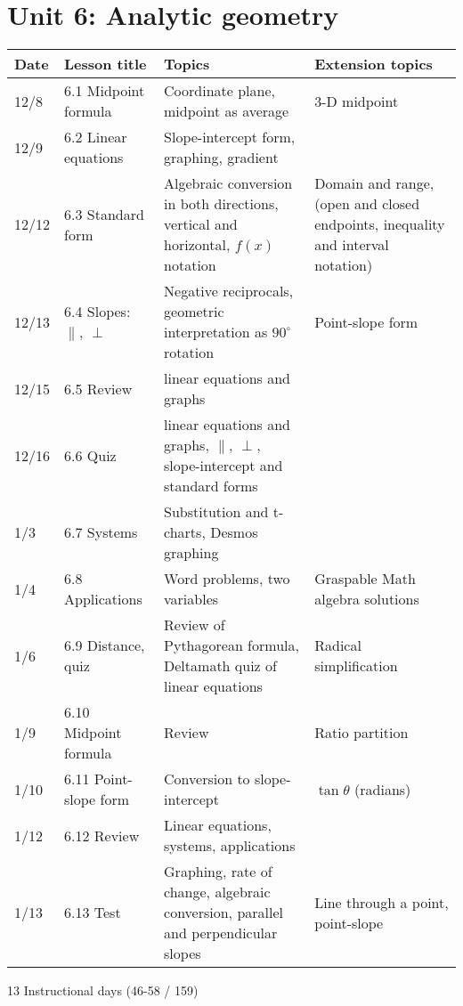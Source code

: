 \section*{Unit 6: Analytic geometry}
\begin{tabular}{|p{0.9cm}|p{4cm}|p{7cm}|p{5cm}|}
  \hline
  Date & Lesson title & Topics  & Extension topics \\
  \hline
  12/8 & 6.1 Midpoint formula & Coordinate plane, midpoint as average & 3-D midpoint \\
  \hline
  12/9 & 6.2 Linear equations & Slope-intercept form, graphing, gradient &  \\
  \hline
  12/12 & 6.3 Standard form & Algebraic conversion in both directions, vertical and horizontal, $f(x)$ notation & Domain and range, (open and closed endpoints, inequality and interval notation) \\
  \hline
  12/13 & 6.4 Slopes: $\parallel$, $\perp$ & Negative reciprocals, geometric interpretation as $90^\circ$ rotation & Point-slope form \\
  \hline
  12/15 & 6.5 Review & linear equations and graphs &  \\
  \hline
  12/16 & 6.6 Quiz & linear equations and graphs, $\parallel$, $\perp$, slope-intercept and standard forms & \\
  \hline
  1/3 & 6.7 Systems & Substitution and t-charts, Desmos graphing &  \\
  \hline
  1/4 & 6.8 Applications & Word problems, two variables & Graspable Math algebra solutions \\
  \hline
  1/6 & 6.9 Distance, quiz & Review of Pythagorean formula, Deltamath quiz of linear equations & Radical simplification \\
  \hline
  1/9 & 6.10 Midpoint formula & Review & Ratio partition \\
  \hline
  1/10 & 6.11 Point-slope form & Conversion to slope-intercept & $\tan \theta$ (radians) \\
  \hline
  1/12 & 6.12 Review & Linear equations, systems, applications &  \\
  \hline
  1/13 & 6.13 Test & Graphing, rate of change, algebraic conversion, parallel and perpendicular slopes & Line through a point, point-slope \\
  \hline

\end{tabular} \par \vspace*{0.3cm}
13 Instructional days (46-58 / 159)



